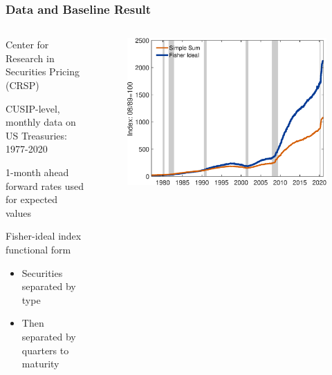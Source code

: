 \documentclass[11pt, handout, aspectratio=169]{beamer}
\newenvironment{wideitemize}{\itemize\addtolength{\itemsep}{10pt}}{\enditemize}
\begin{document}
\begin{frame}
\frametitle{Data and Baseline Result}
\label{slide:BaselineResult}
\begin{columns}[t]
	\begin{column}{0.45\textwidth}
		\begin{wideitemize}
			\item Center for Research in Securities Pricing (CRSP)
			\item CUSIP-level, monthly data on US Treasuries: 1977-2020
			\item 1-month ahead forward rates used for expected values
			\item Fisher-ideal index functional form 
			\begin{itemize}
				\item Securities separated by type
				\item Then separated by quarters to maturity
			\end{itemize}
		\end{wideitemize}	
		\hfill \hyperlink{slide:InitialResult}{}
	\end{column}
	\hfill
	\begin{column}{0.55\textwidth}
		\begin{figure}[h]
			\centering
			\includegraphics[width=\textwidth]{../Figures/FisherIndex_v2.eps}
		\end{figure}
	\end{column}
\end{columns}
\end{frame}
\end{document}
